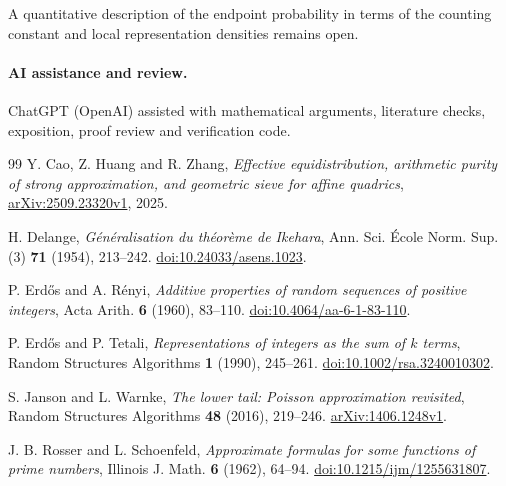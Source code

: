 \documentclass[11pt]{article}
\begin{document}
A quantitative description of the endpoint probability in terms
of the counting constant and local representation densities
remains open.

\paragraph{AI assistance and review.}
ChatGPT (OpenAI) assisted with mathematical arguments, literature checks,
exposition, proof review and verification code.

\begin{thebibliography}{99}
Y. Cao, Z. Huang and R. Zhang,
\emph{Effective equidistribution, arithmetic purity of strong approximation,
and geometric sieve for affine quadrics},
\href{https://arxiv.org/abs/2509.23320v1}{arXiv:2509.23320v1}, 2025.

H. Delange,
\emph{G\'en\'eralisation du th\'eor\`eme de Ikehara},
Ann. Sci. \'Ecole Norm. Sup. (3) \textbf{71} (1954), 213--242.
\href{https://doi.org/10.24033/asens.1023}{doi:10.24033/asens.1023}.

P. Erd\H{o}s and A. R\'enyi,
\emph{Additive properties of random sequences of positive integers},
Acta Arith. \textbf{6} (1960), 83--110.
\href{https://doi.org/10.4064/aa-6-1-83-110}{doi:10.4064/aa-6-1-83-110}.

P. Erd\H{o}s and P. Tetali,
\emph{Representations of integers as the sum of \(k\) terms},
Random Structures Algorithms \textbf{1} (1990), 245--261.
\href{https://doi.org/10.1002/rsa.3240010302}{doi:10.1002/rsa.3240010302}.

S. Janson and L. Warnke,
\emph{The lower tail: Poisson approximation revisited},
Random Structures Algorithms \textbf{48} (2016), 219--246.
\href{https://arxiv.org/abs/1406.1248v1}{arXiv:1406.1248v1}.

J. B. Rosser and L. Schoenfeld,
\emph{Approximate formulas for some functions of prime numbers},
Illinois J. Math. \textbf{6} (1962), 64--94.
\href{https://doi.org/10.1215/ijm/1255631807}{doi:10.1215/ijm/1255631807}.
\end{thebibliography}
\end{document}

